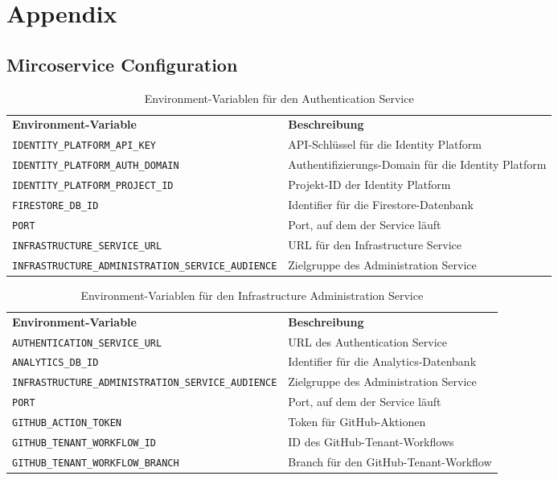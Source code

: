 \section{Appendix}

\subsection{Mircoservice Configuration}
{
\begin{longtable}{l p{6cm}}
  \caption{Environment-Variablen für den Authentication Service}
  \label{tab:auth-service-env-vars} \\
  \textbf{Environment-Variable} & \textbf{Beschreibung} \\ [1ex]
  \texttt{IDENTITY\_PLATFORM\_API\_KEY} & API-Schlüssel für die Identity Platform \\ [0.5ex]
  \texttt{IDENTITY\_PLATFORM\_AUTH\_DOMAIN} & Authentifizierungs-Domain für die Identity Platform \\ [0.5ex]
  \texttt{IDENTITY\_PLATFORM\_PROJECT\_ID} & Projekt-ID der Identity Platform \\ [0.5ex]
  \texttt{FIRESTORE\_DB\_ID} & Identifier für die Firestore-Datenbank \\ [0.5ex]
  \texttt{PORT} & Port, auf dem der Service läuft \\ [0.5ex]
  \texttt{INFRASTRUCTURE\_SERVICE\_URL} & URL für den Infrastructure Service \\ [0.5ex]
  \texttt{INFRASTRUCTURE\_ADMINISTRATION\_SERVICE\_AUDIENCE} & Zielgruppe des Administration Service \\ 
\end{longtable}}


{
\begin{longtable}{l p{6cm}}
  \caption{Environment-Variablen für den Infrastructure Administration Service}
  \label{tab:infra-admin-service-env-vars} \\
  \textbf{Environment-Variable} & \textbf{Beschreibung} \\ [1ex]
  \texttt{AUTHENTICATION\_SERVICE\_URL} & URL des Authentication Service \\ [0.5ex]
  \texttt{ANALYTICS\_DB\_ID} & Identifier für die Analytics-Datenbank \\ [0.5ex]
  \texttt{INFRASTRUCTURE\_ADMINISTRATION\_SERVICE\_AUDIENCE} & Zielgruppe des Administration Service \\ [0.5ex]
  \texttt{PORT} & Port, auf dem der Service läuft \\ [0.5ex]
  \texttt{GITHUB\_ACTION\_TOKEN} & Token für GitHub-Aktionen \\ [0.5ex]
  \texttt{GITHUB\_TENANT\_WORKFLOW\_ID} & ID des GitHub-Tenant-Workflows \\ [0.5ex]
  \texttt{GITHUB\_TENANT\_WORKFLOW\_BRANCH} & Branch für den GitHub-Tenant-Workflow \\ 
\end{longtable}}

